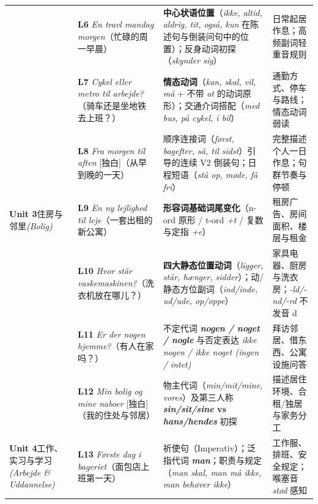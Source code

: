 \documentclass[10.5pt, a4paper]{ctexart}
\begin{document}
{\begin{longtable}{@{} >{\raggedright\arraybackslash}p{2.65cm} >{\raggedright\arraybackslash}p{4.6cm} >{\raggedright\arraybackslash}p{5.15cm} >{\raggedright\arraybackslash}p{3.2cm} @{}}
 & \textbf{L6} \textit{En travl mandag morgen}\newline （忙碌的周一早晨） & \textbf{中心状语位置}（\textit{ikke, altid, aldrig, tit, også, kun} 在陈述句与倒装问句中的位置）；反身动词初探（\textit{skynder sig}） & 日常起居作息；高频副词轻重音规则 \\
 & \textbf{L7} \textit{Cykel eller metro til arbejde?}\newline （骑车还是坐地铁去上班？） & \textbf{情态动词}（\textit{kan, skal, vil, må} + 不带 \textit{at} 的动词原形）；交通介词搭配（\textit{med bus, på cykel, i bil}） & 通勤方式、停车与路线；情态动词弱读 \\
 & \textbf{L8} \textit{Fra morgen til aften} [独白]\newline （从早到晚的一天） & 顺序连接词（\textit{først, bagefter, så, til sidst}）引导的连续 V2 倒装句；日程短语（\textit{stå op, møde, få fri}） & 完整描述个人一日作息；句群节奏与停顿 \\
\midrule
\textbf{Unit 3}\newline 住房与邻里\newline \textit{(Bolig)} & \textbf{L9} \textit{En ny lejlighed til leje}\newline （一套出租的新公寓） & \textbf{形容词基础词尾变化}（n-ord 原形 / t-ord \textit{+t} / 复数与定指 \textit{+e}） & 租房广告、房间面积、楼层与租金 \\
 & \textbf{L10} \textit{Hvor står vaskemaskinen?}\newline （洗衣机放在哪儿？） & \textbf{四大静态位置动词}（\textit{ligger, står, hænger, sidder}）；动/静态方位副词（\textit{ind/inde, ud/ude, op/oppe}） & 家具电器、厨房与洗衣房；\textit{-ld/-nd/-rd} 不发音 d \\
 & \textbf{L11} \textit{Er der nogen hjemme?}\newline （有人在家吗？） & 不定代词 \textbf{\textit{nogen / noget / nogle}} 与否定表达 \textit{ikke nogen / ikke noget (ingen / intet)} & 拜访邻居、借东西、公寓设施问答 \\
 & \textbf{L12} \textit{Min bolig og mine naboer} [独白]\newline （我的住处与邻居） & 物主代词（\textit{min/mit/mine, vores}）及第三人称 \textbf{\textit{sin/sit/sine} vs \textit{hans/hendes}} 初探 & 描述居住环境、合租/独居与家务分工 \\
\midrule
\textbf{Unit 4}\newline 工作、实习与学习\newline \textit{(Arbejde \& Uddannelse)} & \textbf{L13} \textit{Første dag i bageriet}\newline （面包店上班第一天） & 祈使句（Imperativ）；泛指代词 \textbf{\textit{man}}；职责与规定（\textit{man skal, man må ikke, man behøver ikke}） & 工作服、排班、安全规定；喉塞音 \textit{stød} 感知 \\

\end{longtable}}
\end{document}
